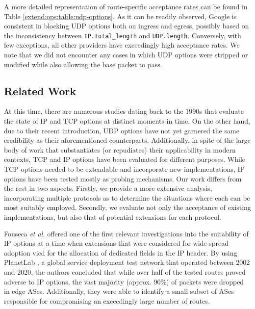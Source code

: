A more detailed representation of route-specific acceptance rates can be found in Table \ref{extend:ops:table:udp-options}. As it can be readily observed, Google is consistent in blocking UDP options both on ingress and egress, possibly based on the inconsistency between \texttt{IP.total\_length} and \texttt{UDP.length}. Conversely, with few exceptions, all other providers have exceedingly high acceptance rates. We note that we did not encounter any cases in which UDP options were stripped or modified while also allowing the base packet to pass.

\subsection{Related Work}
\label{extend:ops::relatedwork}

At this time, there are numerous studies dating back to the 1990s that evaluate the state of IP and TCP options at distinct moments in time. On the other hand, due to their recent introduction, UDP options have not yet garnered the same credibility as their aforementioned counterparts. Additionally, in spite of the large body of work that substantiates (or repudiates) their applicability in modern contexts, TCP and IP options have been evaluated for different purposes. While TCP options needed to be extendable and incorporate new implementations, IP options have been tested mostly as probing mechanisms. Our work differs from the rest in two aspects. Firstly, we provide a more extensive analysis, incorporating multiple protocols as to determine the situations where each can be most suitably employed. Secondly, we evaluate not only the acceptance of existing implementations, but also that of potential extensions for each protocol.

Fonseca \textit{et al.} \cite{fonseca2005ip} offered one of the first relevant investigations into the suitability of IP options at a time when extensions that were considered for wide-spread adoption vied for the allocation of dedicated fields in the IP header. By using PlanetLab \cite{chun2003planetlab}, a global service deployment test network that operated between 2002 and 2020, the authors concluded that while over half of the tested routes proved adverse to IP options, the vast majority (approx. 90\%) of packets were dropped in edge ASes. Additionally, they were able to identify a small subset of ASes responsible for compromising an exceedingly large number of routes.

